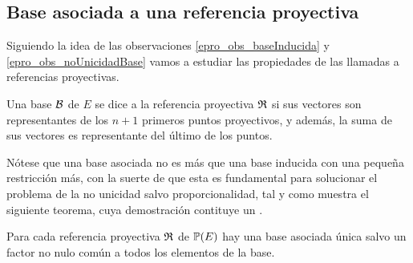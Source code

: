 \subsection{Base asociada a una referencia proyectiva}
Siguiendo la idea de las observaciones \ref{epro_obs_baseInducida} y \ref{epro_obs_noUnicidadBase} vamos a estudiar las propiedades de las llamadas  a referencias proyectivas.
\begin{defi}
	\label{epro_def_baseAsociada}
	Una base $\mathcal{B}$ de $E$ se dice  a la referencia proyectiva $\mathfrak{R}$ si sus vectores son representantes de los $n+1$ primeros puntos proyectivos, y además, la suma de sus vectores es representante del último de los puntos.
\end{defi}
Nótese que una base asociada no es más que una base inducida con una pequeña restricción más, con la suerte de que esta es fundamental para solucionar el problema de la no unicidad salvo proporcionalidad, tal y como muestra el siguiente teorema, cuya demostración contituye un .
\begin{theo}
	\label{epro_teo_unicidadBase}
	Para cada referencia proyectiva $\mathfrak{R}$ de $\mathbb{P}(E)$ hay una base asociada única salvo un factor no nulo común a todos los elementos de la base.
\end{theo}
